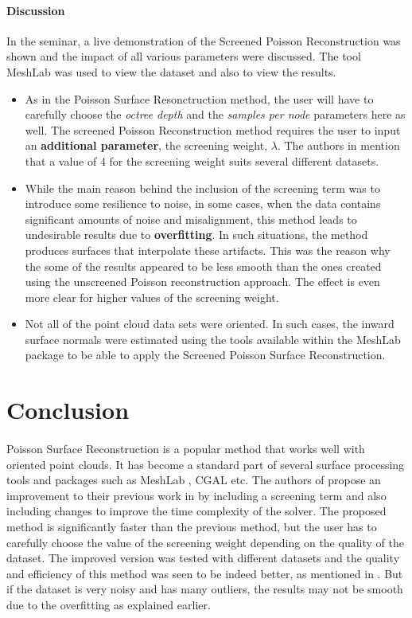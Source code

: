 \documentclass[12pt,a4paper]{article}
\begin{document}
\paragraph{Discussion} 
In the seminar, a live demonstration of the Screened Poisson Reconstruction was shown and the impact of all various parameters were discussed. The tool MeshLab \cite{MLAB} was used to view the dataset and also to view the results. 
\begin{itemize}
\item  As in the Poisson Surface Resonctruction method, the user will have to carefully choose the \textit{octree depth} and the \textit{samples per node} parameters here as well. The screened Poisson Reconstruction method requires the user to input an \textbf{additional parameter}, the screening weight, $\lambda$. The authors in \cite{ScreenedPoisson} mention that a value of 4 for the screening weight suits several different datasets.
\item While the main reason behind the inclusion of the screening term was to introduce some resilience to noise, in some cases, when the data contains significant amounts of noise and misalignment, this method leads to undesirable results due to \textbf{overfitting}. In such situations, the method produces surfaces that interpolate these artifacts. This was the reason why the some of the results appeared to be less smooth than the ones created using the unscreened Poisson reconstruction approach. The effect is even more clear for higher values of the screening weight.
\item Not all of the point cloud data sets were oriented. In such cases, the inward surface normals were estimated using the tools available within the MeshLab package to be able to apply the Screened Poisson Surface Reconstruction.
\end{itemize}

\section{Conclusion}
\paragraph{}
Poisson Surface Reconstruction is a popular method that works well with oriented point clouds. It has become a standard part of several surface processing tools and packages such as MeshLab \cite{MLAB}, CGAL \cite{cgal:eb-15a} etc. The authors of \cite{ScreenedPoisson} propose an improvement to their previous work in \cite{Poisson} by including a screening term and also including changes to improve the time complexity of the solver. The proposed method is significantly faster than the previous method, but the user has to carefully choose the value of the screening weight depending on the quality of the dataset. The improved version was tested with different datasets and the quality and efficiency of this method was seen to be indeed better, as mentioned in \cite{ScreenedPoisson}. But if the dataset is very noisy and has many outliers, the results may not be smooth due to the overfitting as explained earlier. 
\end{document}
